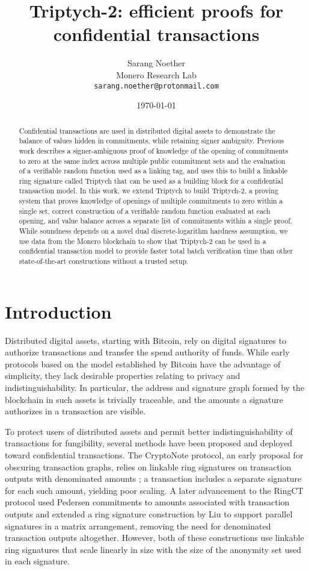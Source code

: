\documentclass{article}
\title{Triptych-2: efficient proofs for confidential transactions}
\author{Sarang Noether \\ Monero Research Lab \\ \texttt{sarang.noether@protonmail.com}}
\date{\today}
\theoremstyle{definition}
\begin{document}
\maketitle


\begin{abstract}
Confidential transactions are used in distributed digital assets to demonstrate the balance of values hidden in commitments, while retaining signer ambiguity.
Previous work describes a signer-ambiguous proof of knowledge of the opening of commitments to zero at the same index across multiple public commitment sets and the evaluation of a verifiable random function used as a linking tag, and uses this to build a linkable ring signature called Triptych that can be used as a building block for a confidential transaction model.
In this work, we extend Triptych to build Triptych-2, a proving system that proves knowledge of openings of multiple commitments to zero within a single set, correct construction of a verifiable random function evaluated at each opening, and value balance across a separate list of commitments within a single proof.
While soundness depends on a novel dual discrete-logarithm hardness assumption, we use data from the Monero blockchain to show that Triptych-2 can be used in a confidential transaction model to provide faster total batch verification time than other state-of-the-art constructions without a trusted setup.
\end{abstract}


\section{Introduction}
Distributed digital assets, starting with Bitcoin, rely on digital signatures to authorize transactions and transfer the spend authority of funds.
While early protocols based on the model established by Bitcoin have the advantage of simplicity, they lack desirable properties relating to privacy and indistinguishability.
In particular, the address and signature graph formed by the blockchain in such assets is trivially traceable, and the amounts a signature authorizes in a transaction are visible.

To protect users of distributed assets and permit better indistinguishability of transactions for fungibility, several methods have been proposed and deployed toward confidential transactions.
The CryptoNote protocol, an early proposal for obscuring transaction graphs, relies on linkable ring signatures on transaction outputs with denominated amounts \cite{cryptonote}; a transaction includes a separate signature for each such amount, yielding poor scaling.
A later advancement to the RingCT protocol \cite{ringct} used Pedersen commitments to amounts associated with transaction outputs and extended a ring signature construction by Liu  \cite{liu} to support parallel signatures in a matrix arrangement, removing the need for denominated transaction outputs altogether.
However, both of these constructions use linkable ring signatures that scale linearly in size with the size of the anonymity set used in each signature.
\end{document}
